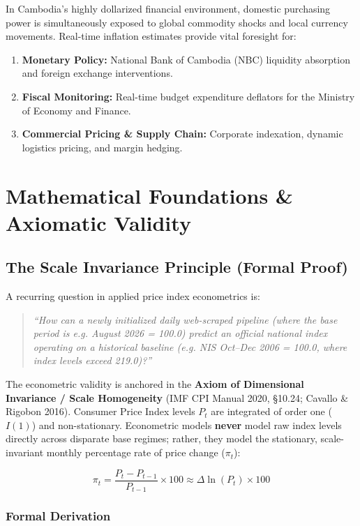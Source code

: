 \documentclass[11pt,a4paper]{article}
\begin{document}
In Cambodia's highly dollarized financial environment, domestic purchasing power is simultaneously exposed to global commodity shocks and local currency movements. Real-time inflation estimates provide vital foresight for:
\begin{enumerate}
    \item \textbf{Monetary Policy:} National Bank of Cambodia (NBC) liquidity absorption and foreign exchange interventions.
    \item \textbf{Fiscal Monitoring:} Real-time budget expenditure deflators for the Ministry of Economy and Finance.
    \item \textbf{Commercial Pricing \& Supply Chain:} Corporate indexation, dynamic logistics pricing, and margin hedging.
\end{enumerate}

\section{Mathematical Foundations \& Axiomatic Validity}

\subsection{The Scale Invariance Principle (Formal Proof)}

A recurring question in applied price index econometrics is:
\begin{quote}
\textit{``How can a newly initialized daily web-scraped pipeline (where the base period is e.g. August 2026 = 100.0) predict an official national index operating on a historical baseline (e.g. NIS Oct--Dec 2006 = 100.0, where index levels exceed 219.0)?''}
\end{quote}

The econometric validity is anchored in the \textbf{Axiom of Dimensional Invariance / Scale Homogeneity} (IMF CPI Manual 2020, \S10.24; Cavallo \& Rigobon 2016). Consumer Price Index levels $P_t$ are integrated of order one ($I(1)$) and non-stationary. Econometric models \textbf{never} model raw index levels directly across disparate base regimes; rather, they model the stationary, scale-invariant monthly percentage rate of price change ($\pi_t$):

\begin{equation}
    \pi_t = \frac{P_t - P_{t-1}}{P_{t-1}} \times 100 \approx \Delta \ln(P_t) \times 100
\end{equation}

\subsubsection*{Formal Derivation}
\end{document}

